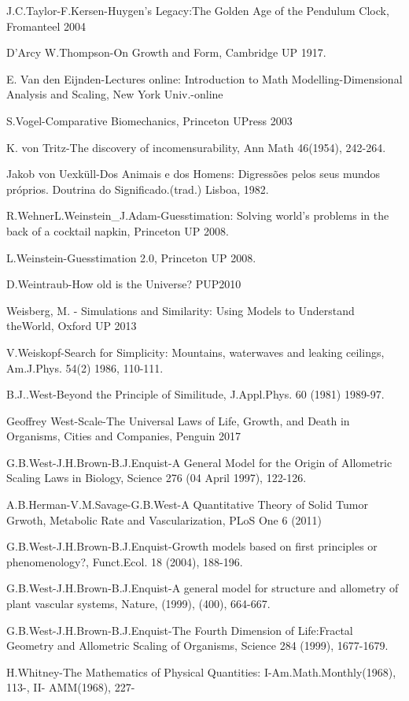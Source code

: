 J.C.Taylor-F.Kersen-Huygen’s Legacy:The Golden Age of the Pendulum Clock, Fromanteel 2004

D’Arcy W.Thompson-On Growth and Form, Cambridge UP 1917.

E. Van den Eijnden-Lectures online: Introduction to Math Modelling-Dimensional Analysis and Scaling, New York Univ.-online

S.Vogel-Comparative Biomechanics, Princeton UPress 2003

K. von Tritz-The discovery of incomensurability, Ann Math 46(1954), 242-264.

Jakob von Uexküll-Dos Animais e dos Homens: Digressões pelos seus mundos próprios. Doutrina do Significado.(trad.) Lisboa, 1982.

R.WehnerL.Weinstein\_J.Adam-Guesstimation: Solving world’s problems in the back of a cocktail napkin, Princeton UP 2008.

L.Weinstein-Guesstimation 2.0, Princeton UP 2008.

D.Weintraub-How old is the Universe? PUP2010

Weisberg, M. - Simulations and Similarity: Using Models to Understand theWorld, Oxford UP 2013

V.Weiskopf-Search for Simplicity: Mountains, waterwaves and leaking ceilings, Am.J.Phys. 54(2) 1986, 110-111.

B.J..West-Beyond the Principle of Similitude, J.Appl.Phys. 60 (1981) 1989-97.

Geoffrey West-Scale-The Universal Laws of Life, Growth, and Death in Organisms, Cities and Companies, Penguin 2017

G.B.West-J.H.Brown-B.J.Enquist-A General Model for the Origin of Allometric Scaling Laws in Biology, Science 276 (04 April 1997), 122-126.

A.B.Herman-V.M.Savage-G.B.West-A Quantitative Theory of Solid Tumor Grwoth, Metabolic Rate and Vascularization, PLoS One 6 (2011)

G.B.West-J.H.Brown-B.J.Enquist-Growth models based on first principles or phenomenology?, Funct.Ecol. 18 (2004), 188-196.

G.B.West-J.H.Brown-B.J.Enquist-A general model for structure and allometry of plant vascular systems, Nature, (1999), (400), 664-667.

G.B.West-J.H.Brown-B.J.Enquist-The Fourth Dimension of Life:Fractal Geometry and Allometric Scaling of Organisms, Science 284 (1999), 1677-1679.

H.Whitney-The Mathematics of Physical Quantities: I-Am.Math.Monthly(1968), 113-, II- AMM(1968), 227-

